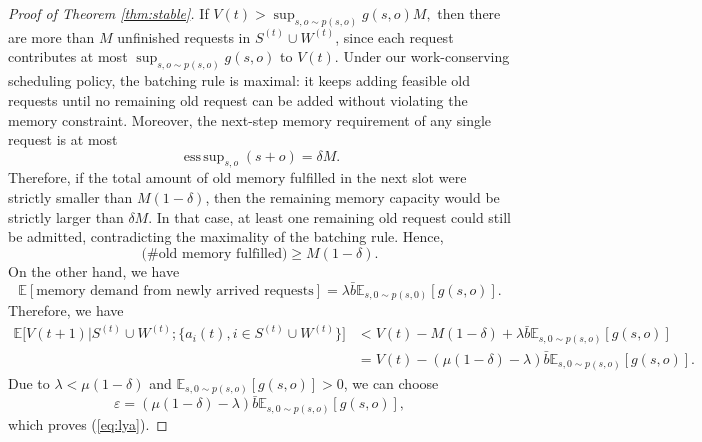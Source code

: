 \documentclass{article}
\theoremstyle{plain}
\theoremstyle{definition}
\theoremstyle{remark}
\begin{document}
\begin{proof}[Proof of Theorem \ref{thm:stable}]
If
$
V(t)>\sup_{s,o\sim p(s,o)} g(s,o)M,
$
then there are more than \(M\) unfinished requests in \(S^{(t)}\cup W^{(t)}\), since each request contributes at most $\sup_{s,o\sim p(s,o)} g(s,o)$ to \(V(t)\). Under our work-conserving scheduling policy, the batching rule is maximal: it keeps adding feasible old requests until no remaining old request can be added without violating the memory constraint. 
Moreover, the next-step memory requirement of any single request is at most
\[
\operatorname{ess\,sup}_{s,o}(s+o)=\delta M .
\]
Therefore, if the total amount of old memory fulfilled in the next slot were strictly smaller than \(M(1-\delta)\), then the remaining memory capacity would be strictly larger than \(\delta M\). In that case, at least one remaining old request could still be admitted, contradicting the maximality of the batching rule. Hence,
\[
\bigl(\text{\# old memory fulfilled}\bigr)\ge M(1-\delta).
\]
On the other hand, we have
\[
\mathbb{E}[\text{memory demand from newly arrived requests}]=\lambda\bar{b}\mathbb{E}_{s,0\sim p(s,0)}[g(s,o)].
\]
Therefore, we have 
\begin{align*}
\mathbb{E}\bigl[V(t+1)|S^{(t)}\cup W^{(t)};\{a_i(t),i\in S^{(t)}\cup W^{(t)}\}\bigr]& <V(t)-M(1-\delta)+\lambda\bar{b}\mathbb{E}_{s,0\sim p(s,o)}[g(s,o)] \\
&=V(t)-(\mu(1-\delta)-\lambda)\bar{b}\mathbb{E}_{s,0\sim p(s,o)}[g(s,o)].
\end{align*}
Due to $\lambda <\mu(1-\delta)$ and $\mathbb{E}_{s,0\sim p(s,o)}[g(s,o)]>0$, we can choose $$\varepsilon=(\mu(1-\delta)-\lambda)\bar{b}\mathbb{E}_{s,0\sim p(s,o)}[g(s,o)],$$ which proves (\ref{eq:lya}).













































\end{proof}
\end{document}
